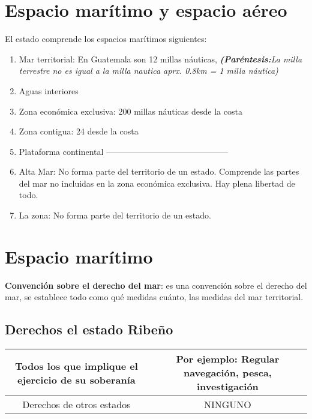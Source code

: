 \section{Espacio marítimo y espacio aéreo}
El estado comprende los espacios marítimos siguientes:
\begin{enumerate}
    \item Mar territorial: En Guatemala son 12 millas náuticas, \emph{\textbf{(Paréntesis:}La milla terrestre no es igual a la milla nautica aprx. 0.8km = 1 milla náutica)}
    \item Aguas interiores
    \item Zona económica exclusiva: 200 millas náuticas desde la costa
    \item Zona contigua: 24 desde la costa
    \item Plataforma continental \newline 
    --------------------------------------------
    \item Alta Mar: No forma parte del territorio de un estado. Comprende las partes del mar no incluidas en la zona económica exclusiva. Hay plena libertad de todo.
    \item La zona: No forma parte del territorio de un estado. 
\end{enumerate}

\section{Espacio marítimo}
\textbf{Convención sobre el derecho del mar}: es una convención sobre el derecho del mar, se establece todo como qué medidas cuánto, las medidas del mar territorial. \newline 

\subsection{Derechos el estado Ribeño}
\begin{center}
\begin{tabular}{ | c | c | }
\hline
 Todos los que implique el ejercicio de su soberanía & Por ejemplo: Regular navegación, pesca, investigación  \\
\hline
 Derechos de otros estados & NINGUNO \\  
 \hline
\end{tabular}
\end{center}

